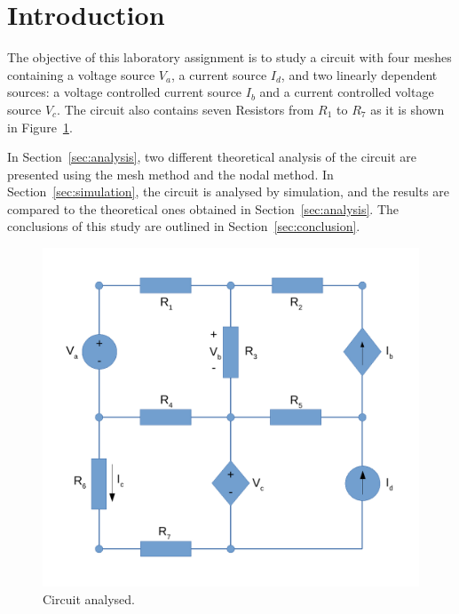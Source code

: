 \section{Introduction}
\label{sec:introduction}

The objective of this laboratory assignment is to study a circuit with four meshes containing a
voltage source $V_a$, a current source $I_d$, and two linearly dependent sources: a voltage controlled current source $I_b$ and a current controlled voltage source $V_c$. The circuit also contains seven Resistors from $R_1$ to $R_7$ as it is shown in Figure~\ref{fig:Circuit_Base}.

In Section~\ref{sec:analysis}, two different theoretical analysis of the circuit are
presented using the mesh method and the nodal method. In Section~\ref{sec:simulation}, the circuit is analysed by
simulation, and the results are compared to the theoretical ones obtained in
Section~\ref{sec:analysis}. The conclusions of this study are outlined in
Section~\ref{sec:conclusion}.

\begin{figure}[h] \centering
\includegraphics[width=0.5\linewidth]{Circuit.pdf}
\caption{Circuit analysed.}
\label{fig:Circuit_Base}
\end{figure}

